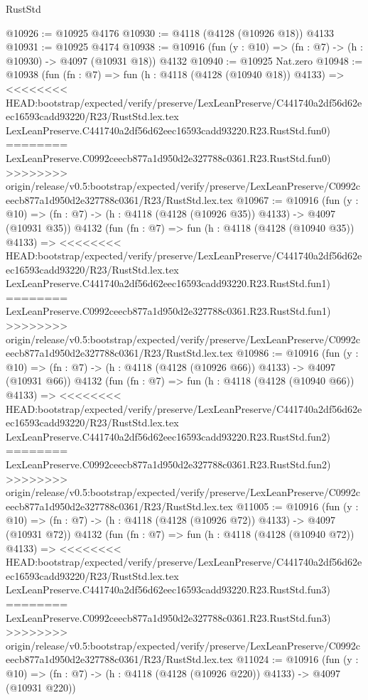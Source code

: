 \begin{lexlean}{RustStd}
\begin{coremodule}
{\begin{coremodule}
{{{{{{{{{{{{{{@10926 := @10925 @4176
@10930 := @4118 (@4128 (@10926 @18)) @4133
@10931 := @10925 @4174
@10938 := @10916 (fun (y : @10) => (fn : @7) -> (h : @10930) -> @4097 (@10931 @18)) @4132
@10940 := @10925 Nat.zero
@10948 := @10938
    (fun (fn : @7) =>
    fun (h : @4118 (@4128 (@10940 @18)) @4133) =>
<<<<<<<< HEAD:bootstrap/expected/verify/preserve/LexLeanPreserve/C441740a2df56d62eec16593cadd93220/R23/RustStd.lex.tex
    LexLeanPreserve.C441740a2df56d62eec16593cadd93220.R23.RustStd.fun0)
========
    LexLeanPreserve.C0992ceecb877a1d950d2e327788c0361.R23.RustStd.fun0)
>>>>>>>> origin/release/v0.5:bootstrap/expected/verify/preserve/LexLeanPreserve/C0992ceecb877a1d950d2e327788c0361/R23/RustStd.lex.tex
@10967 := @10916
    (fun (y : @10) => (fn : @7) -> (h : @4118 (@4128 (@10926 @35)) @4133) -> @4097 (@10931 @35))
    @4132
    (fun (fn : @7) =>
    fun (h : @4118 (@4128 (@10940 @35)) @4133) =>
<<<<<<<< HEAD:bootstrap/expected/verify/preserve/LexLeanPreserve/C441740a2df56d62eec16593cadd93220/R23/RustStd.lex.tex
    LexLeanPreserve.C441740a2df56d62eec16593cadd93220.R23.RustStd.fun1)
========
    LexLeanPreserve.C0992ceecb877a1d950d2e327788c0361.R23.RustStd.fun1)
>>>>>>>> origin/release/v0.5:bootstrap/expected/verify/preserve/LexLeanPreserve/C0992ceecb877a1d950d2e327788c0361/R23/RustStd.lex.tex
@10986 := @10916
    (fun (y : @10) => (fn : @7) -> (h : @4118 (@4128 (@10926 @66)) @4133) -> @4097 (@10931 @66))
    @4132
    (fun (fn : @7) =>
    fun (h : @4118 (@4128 (@10940 @66)) @4133) =>
<<<<<<<< HEAD:bootstrap/expected/verify/preserve/LexLeanPreserve/C441740a2df56d62eec16593cadd93220/R23/RustStd.lex.tex
    LexLeanPreserve.C441740a2df56d62eec16593cadd93220.R23.RustStd.fun2)
========
    LexLeanPreserve.C0992ceecb877a1d950d2e327788c0361.R23.RustStd.fun2)
>>>>>>>> origin/release/v0.5:bootstrap/expected/verify/preserve/LexLeanPreserve/C0992ceecb877a1d950d2e327788c0361/R23/RustStd.lex.tex
@11005 := @10916
    (fun (y : @10) => (fn : @7) -> (h : @4118 (@4128 (@10926 @72)) @4133) -> @4097 (@10931 @72))
    @4132
    (fun (fn : @7) =>
    fun (h : @4118 (@4128 (@10940 @72)) @4133) =>
<<<<<<<< HEAD:bootstrap/expected/verify/preserve/LexLeanPreserve/C441740a2df56d62eec16593cadd93220/R23/RustStd.lex.tex
    LexLeanPreserve.C441740a2df56d62eec16593cadd93220.R23.RustStd.fun3)
========
    LexLeanPreserve.C0992ceecb877a1d950d2e327788c0361.R23.RustStd.fun3)
>>>>>>>> origin/release/v0.5:bootstrap/expected/verify/preserve/LexLeanPreserve/C0992ceecb877a1d950d2e327788c0361/R23/RustStd.lex.tex
@11024 := @10916
    (fun (y : @10) => (fn : @7) -> (h : @4118 (@4128 (@10926 @220)) @4133) -> @4097 (@10931 @220))
}}}}}}}}}}}}}}
\end{coremodule}}
\end{coremodule}
\end{lexlean}

